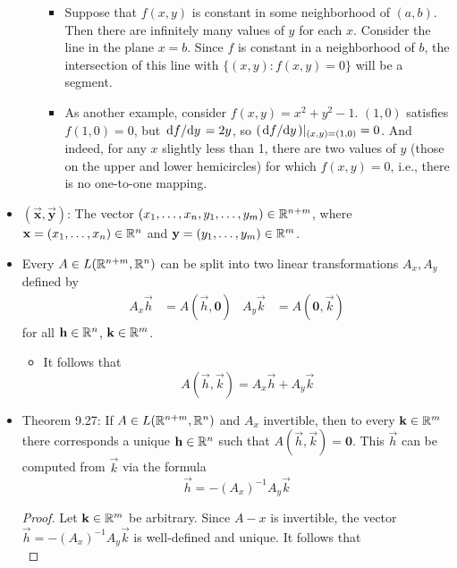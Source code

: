 \documentclass[../notes.tex]{subfiles}
\begin{document}
\begin{itemize}
\begin{itemize}
        \begin{itemize}
            \item Suppose that $f(x,y)$ is constant in some neighborhood of $(a,b)$. Then there are infinitely many values of $y$ for each $x$. Consider the line in the plane $x=b$. Since $f$ is constant in a neighborhood of $b$, the intersection of this line with $\{(x,y):f(x,y)=0\}$ will be a segment.
            \item As another example, consider $f(x,y)=x^2+y^2-1$. $(1,0)$ satisfies $f(1,0)=0$, but $\dv*{f}{y}=2y$, so $(\dv*{f}{y})|_{(x,y)=(1,0)}=0$. And indeed, for any $x$ slightly less than 1, there are two values of $y$ (those on the upper and lower hemicircles) for which $f(x,y)=0$, i.e., there is no one-to-one mapping.
        \end{itemize}
    \end{itemize}
    \item $\bm{(\vec{x},\vec{y})}$: The vector $(x_1,\dots,x_n,y_1,\dots,y_m)\in\mathbb{R}^{n+m}$, where $\mathbf{x}=(x_1,\dots,x_n)\in\mathbb{R}^n$ and $\mathbf{y}=(y_1,\dots,y_m)\in\mathbb{R}^m$.
    \item Every $A\in L(\mathbb{R}^{n+m},\mathbb{R}^n)$ can be split into two linear transformations $A_x,A_y$ defined by
    \begin{align*}
        A_x\vec{h} &= A(\vec{h},\bm{0})&
        A_y\vec{k} &= A(\bm{0},\vec{k})
    \end{align*}
    for all $\mathbf{h}\in\mathbb{R}^n$, $\mathbf{k}\in\mathbb{R}^m$.
    \begin{itemize}
        \item It follows that
        \begin{equation*}
            A(\vec{h},\vec{k}) = A_x\vec{h}+A_y\vec{k}
        \end{equation*}
    \end{itemize}
    \item Theorem 9.27: If $A\in L(\mathbb{R}^{n+m},\mathbb{R}^n)$ and $A_x$ invertible, then to every $\mathbf{k}\in\mathbb{R}^m$ there corresponds a unique $\mathbf{h}\in\mathbb{R}^n$ such that $A(\vec{h},\vec{k})=\bm{0}$. This $\vec{h}$ can be computed from $\vec{k}$ via the formula
    \begin{equation*}
        \vec{h} = -(A_x)^{-1}A_y\vec{k}
    \end{equation*}
    \begin{proof}
        Let $\mathbf{k}\in\mathbb{R}^m$ be arbitrary. Since $A-x$ is invertible, the vector $\vec{h}=-(A_x)^{-1}A_y\vec{k}$ is well-defined and unique. It follows that
        \begin{equation*}

\end{equation*}
\end{proof}
\end{itemize}
\end{document}
